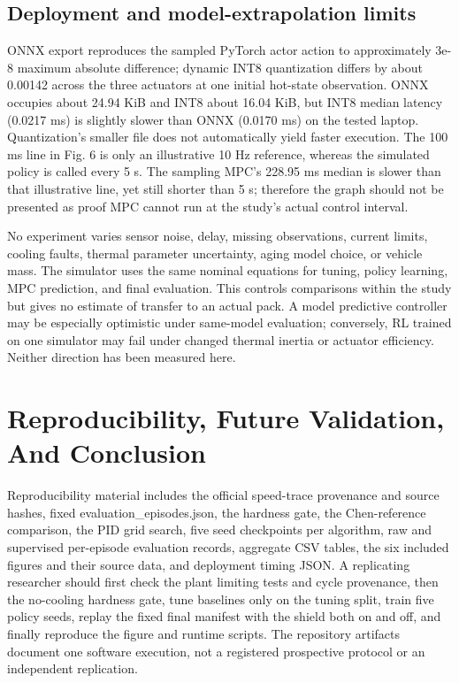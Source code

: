 \documentclass[conference]{IEEEtran}
\begin{document}
\subsection{Deployment and model-extrapolation limits}
ONNX export reproduces the sampled PyTorch actor action to approximately 3e-8 maximum absolute difference; dynamic INT8 quantization differs by about 0.00142 across the three actuators at one initial hot-state observation. ONNX occupies about 24.94 KiB and INT8 about 16.04 KiB, but INT8 median latency (0.0217 ms) is slightly slower than ONNX (0.0170 ms) on the tested laptop. Quantization's smaller file does not automatically yield faster execution. The 100 ms line in Fig. 6 is only an illustrative 10 Hz reference, whereas the simulated policy is called every 5 s. The sampling MPC's 228.95 ms median is slower than that illustrative line, yet still shorter than 5 s; therefore the graph should not be presented as proof MPC cannot run at the study's actual control interval.

No experiment varies sensor noise, delay, missing observations, current limits, cooling faults, thermal parameter uncertainty, aging model choice, or vehicle mass. The simulator uses the same nominal equations for tuning, policy learning, MPC prediction, and final evaluation. This controls comparisons within the study but gives no estimate of transfer to an actual pack. A model predictive controller may be especially optimistic under same-model evaluation; conversely, RL trained on one simulator may fail under changed thermal inertia or actuator efficiency. Neither direction has been measured here.

\section{Reproducibility, Future Validation, And Conclusion}
Reproducibility material includes the official speed-trace provenance and source hashes, fixed evaluation\_episodes.json, the hardness gate, the Chen-reference comparison, the PID grid search, five seed checkpoints per algorithm, raw and supervised per-episode evaluation records, aggregate CSV tables, the six included figures and their source data, and deployment timing JSON. A replicating researcher should first check the plant limiting tests and cycle provenance, then the no-cooling hardness gate, tune baselines only on the tuning split, train five policy seeds, replay the fixed final manifest with the shield both on and off, and finally reproduce the figure and runtime scripts. The repository artifacts document one software execution, not a registered prospective protocol or an independent replication.
\end{document}

